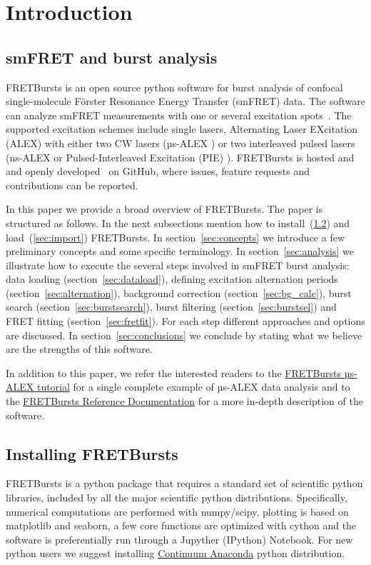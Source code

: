 \section{Introduction}

\subsection{smFRET and burst analysis}

FRETBursts is an open source python software for burst analysis of confocal 
single-molecule Förster Resonance Energy Transfer (smFRET) data. The software can analyze smFRET measurements
with one or several excitation spots~\cite{Ingargiola_2013}. The supported 
excitation schemes include single lasers, Alternating Laser EXcitation (ALEX) with either two CW lasers (µs-ALEX \cite{Kapanidis_2005}) 
or two interleaved pulsed lasers (ns-ALEX \cite{16287971} or Pulsed-Interleaved Excitation (PIE) \cite{M_ller_2005}). 
FRETBursts is hosted and and openly developed~\cite{Prli__2012} on GitHub, where
issues, feature requests and contributions can be reported.

In this paper we provide a broad overview of FRETBursts. 
The paper is structured as follows. 
In the next subsections mention how to install~(\ref{sec:install}) and 
load~(\ref{sec:import}) FRETBursts.
In section~\ref{sec:concepts} we
introduce a few preliminary concepts and some specific terminology.
In section~\ref{sec:analysis} we illustrate how to execute the several steps involved
in smFRET burst analysis: data loading (section~\ref{sec:dataload}), defining 
excitation alternation periods (section~\ref{sec:alternation}), background 
correction (section~\ref{sec:bg_calc}), burst search (section~\ref{sec:burstsearch}), 
burst filtering (section~\ref{sec:burstsel}) and FRET fitting (section~\ref{sec:fretfit}). 
For each step different approaches and options are discussed. 
In section~\ref{sec:conclusions} we conclude by stating what we believe are
the strengths of this software.

In addition to this paper, we refer the interested readers to the 
\href{http://nbviewer.ipython.org/github/tritemio/FRETBursts_notebooks/blob/master/notebooks/FRETBursts\%20-\%20us-ALEX\%20smFRET\%20burst\%20analysis.ipynb}{FRETBursts µs-ALEX tutorial} 
for a single complete example of µs-ALEX data analysis and to the
\href{http://fretbursts.readthedocs.org/}{FRETBursts Reference Documentation}
for a more in-depth description of the software.

\subsection{Installing FRETBursts}
\label{sec:install}
FRETBursts is a python package that requires a standard set of scientific 
python libraries, included by all the major scientific python 
distributions. 
Specifically, numerical computations are performed with numpy/scipy, 
plotting is based on matplotlib and seaborn, a few core functions are
optimized with cython and the software is preferentially run through
a Jupyther (IPython) Notebook.
For new python users we suggest installing 
\href{https://store.continuum.io/cshop/anaconda/}{Continuum Anaconda}
python distribution.

